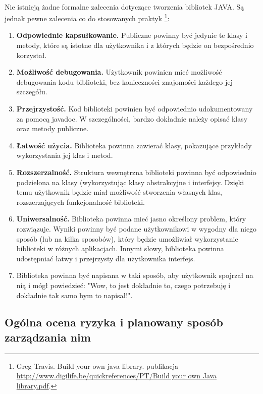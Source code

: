 \paragraph{} Nie istnieją żadne formalne zalecenia dotyczące tworzenia bibliotek JAVA. Są jednak pewne zalecenia co do stosowanych praktyk \footnote{Greg    Travis.          Build    your   own     java  library.          publikacja
\url{http://www.digilife.be/quickreferences/PT/Build your own Java library.pdf}.
}:
\begin{enumerate}
\item \textbf{Odpowiednie kapsułkowanie.} Publiczne powinny być jedynie te klasy i metody, które są istotne dla użytkownika i z których będzie on bezpośrednio korzystał.
\item \textbf{Możliwość debugowania.} Użytkownik powinien mieć możliwość debugowania kodu biblioteki, bez konieczności znajomości każdego jej szczegółu.
\item  \textbf{Przejrzystość.} Kod biblioteki powinien być odpowiednio udokumentowany za pomocą javadoc. W szczególności, bardzo dokładnie należy opisać klasy oraz metody publiczne.
\item \textbf{Łatwość użycia.} Biblioteka powinna zawierać klasy, pokazujące przykłady wykorzystania jej klas i metod.
\item \textbf{ Rozszerzalność.} Struktura wewnętrzna biblioteki powinna być odpowiednio podzielona na klasy (wykorzystując klasy abstrakcyjne i interfejsy. Dzięki temu użytkownik będzie miał możliwość stworzenia własnych klas, rozszerzających funkcjonalność biblioteki.
\item \textbf{Uniwersalność.} Biblioteka powinna mieć jasno określony problem, który rozwiązuje. Wyniki powinny być podane użytkownikowi w wygodny dla niego sposób (lub na kilka sposobów), który będzie umożliwiał wykorzystanie biblioteki w różnych aplikacjach. Innymi słowy, biblioteka powinna udostępniać łatwy i przejrzysty dla użytkownika interfejs.
\item Biblioteka powinna być napisana w taki sposób, aby użytkownik spojrzał na nią i mógł powiedzieć: "Wow, to jest dokładnie to, czego potrzebuję i dokładnie tak samo bym to napisał!".

\end{enumerate}



\subsection{Ogólna ocena ryzyka i planowany sposób zarządzania nim}


